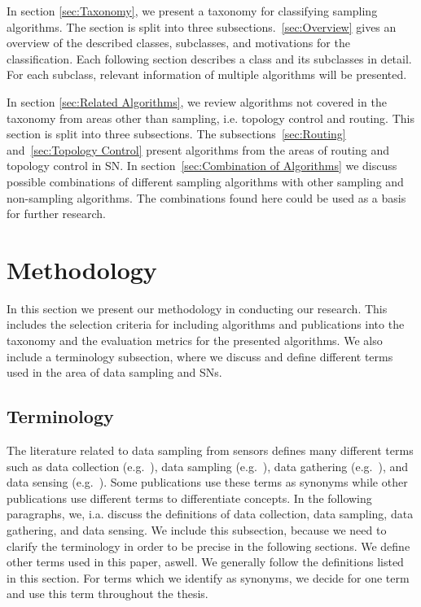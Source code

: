   In section \ref{sec:Taxonomy}, we present a
taxonomy for classifying sampling algorithms. The section is split into three
subsections.~\ref{sec:Overview} gives an overview of the described classes,
subclasses, and motivations for the classification. Each following section
describes a class and its subclasses in detail. For each subclass, relevant
information of multiple algorithms will be presented. 

 In section \ref{sec:Related
Algorithms}, we review algorithms not covered in the taxonomy from areas other
than sampling, i.e. topology control and routing. This section is split into
three subsections. The subsections~\ref{sec:Routing} and~\ref{sec:Topology
Control} present algorithms from the areas of routing and topology control in
\ac{SN}. In section~\ref{sec:Combination of Algorithms} we discuss possible
combinations of different sampling algorithms with other sampling and
non-sampling algorithms. The combinations found here could be used as a basis
for further research.

\section{Methodology}
\label{sec:Methodology}

In this section we present our methodology in conducting our research. This
includes the selection criteria for including algorithms and publications into
the taxonomy and the evaluation metrics for the presented algorithms. We also
include a terminology subsection, where we discuss and define different terms
used in the area of data sampling and \acp{SN}.

\subsection{Terminology}
\label{sec:Terminology}

The literature related to data sampling from sensors defines many different
terms such as data collection (e.g.~\cite{laiymani2013adaptive, liu2007energy,
wang2012adaptive}), data sampling (e.g.~\cite{willett2004backcasting,
jain2004adaptive, szczytowski2010asample}), data gathering
(e.g.~\cite{wang2012data, luo2009compressive, zhang2016data}), and data sensing
(e.g.~\cite{padhy2006utility, mahmudimanesh2012balanced, duarte2005joint}).
Some publications use these terms as synonyms while other publications use
different terms to differentiate concepts. In the following paragraphs, we,
i.a. discuss the definitions of data collection, data sampling, data gathering,
and data sensing. We include this subsection, because we need to clarify the
terminology in order to be precise in the following sections. We define other
terms used in this paper, aswell. We generally follow the definitions listed in
this section. For terms which we identify as synonyms, we decide for one term
and use this term throughout the thesis.

